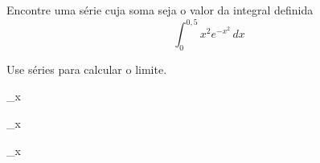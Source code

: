 \begin{exercises}
\begin{exercise}
  Encontre uma série cuja soma seja o valor da integral definida
  \[
    \int_{0}^{0,5} x^2e^{-x^2} \,dx
  \]
\end{exercise}

\begin{exercise}
	Use séries para calcular o limite.
	\begin{mathlist}
		\item \lim_{x} 
		\item \lim_{x} 
		\item \lim_{x} 
	\end{mathlist}
\end{exercise}



\end{exercises}
